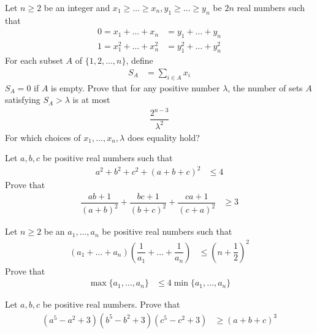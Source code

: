 \documentclass{subfile}
\begin{document}
		\begin{problem}
			Let $n\geq2$ be an integer and $x_{1}\geq\ldots\geq x_{n},y_{1}\geq\ldots\geq y_{n}$ be $2n$ real numbers such that
				\begin{align*}
					0 = x_{1}+\ldots+x_{n}
						& = y_{1}+\ldots+y_{n}\\
					1 = x_{1}^{2}+\ldots+x_{n}^{2}
						& = y_{1}^{2}+\ldots+y_{n}^{2}
				\end{align*}
			For each subset $A$ of $\{1,2,\ldots,n\}$, define
				\begin{align*}
					S_{A}
						& = \sum_{i\in A}x_{i}
				\end{align*}
			$S_{A}=0$ if $A$ is empty. Prove that for any positive number $\lambda$, the number of sets $A$ satisfying $S_{A}>\lambda$ is at most
				\begin{align*}
					\dfrac{2^{n-3}}{\lambda^{2}}
				\end{align*}
			For which choices of $x_{1},\ldots,x_{n},\lambda$ does equality hold?
		\end{problem}
	
		\begin{problem}
			Let $a,b,c$ be positive real numbers such that
				\begin{align*}
					a^{2}+b^{2}+c^{2}+(a+b+c)^{2}
						& \leq 4
				\end{align*}
			Prove that
				\begin{align*}
					\dfrac{ab+1}{(a+b)^{2}}+\dfrac{bc+1}{(b+c)^{2}}+\dfrac{ca+1}{(c+a)^{2}}
						& \geq3
				\end{align*}
		\end{problem}
	
		\begin{problem}
			Let $n\geq2$ be an $a_{1},\ldots,a_{n}$ be positive real numbers such that
				\begin{align*}
					(a_{1}+\ldots+a_{n})\left(\dfrac{1}{a_{1}}+\ldots+\dfrac{1}{a_{n}}\right)
						& \leq \left(n+\dfrac{1}{2}\right)^{2}
				\end{align*}
			Prove that
				\begin{align*}
					\max\{a_{1},\ldots,a_{n}\}
						& \leq4\min\{a_{1},\ldots,a_{n}\}
				\end{align*}
		\end{problem}
	
		\begin{problem}
			Let $a,b,c$ be positive real numbers. Prove that
				\begin{align*}
					(a^{5}-a^{2}+3)(b^{5}-b^{2}+3)(c^{5}-c^{2}+3)
						& \geq (a+b+c)^{3}
				\end{align*}
		\end{problem}
	
\end{document}
